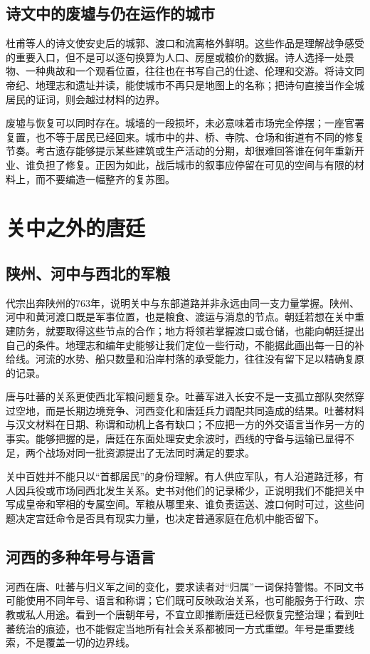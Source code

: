 \subsection{诗文中的废墟与仍在运作的城市}
杜甫等人的诗文使安史后的城郭、渡口和流离格外鲜明。这些作品是理解战争感受的重要入口，但不是可以逐句换算为人口、房屋或粮价的数据。诗人选择一处景物、一种典故和一个观看位置，往往也在书写自己的仕途、伦理和交游。将诗文同帝纪、地理志和遗址并读，能使城市不再只是地图上的名称；把诗句直接当作全城居民的证词，则会越过材料的边界。

废墟与恢复可以同时存在。城墙的一段损坏，未必意味着市场完全停摆；一座官署复置，也不等于居民已经回来。城市中的井、桥、寺院、仓场和街道有不同的修复节奏。考古遗存能够提示某些建筑或生产活动的分期，却很难回答谁在何年重新开业、谁负担了修复。正因为如此，战后城市的叙事应停留在可见的空间与有限的材料上，而不要编造一幅整齐的复苏图。

\section{关中之外的唐廷}

\subsection{陕州、河中与西北的军粮}
代宗出奔陕州的763年，说明关中与东部道路并非永远由同一支力量掌握。陕州、河中和黄河渡口既是军事位置，也是粮食、渡运与消息的节点。朝廷若想在关中重建防务，就要取得这些节点的合作；地方将领若掌握渡口或仓储，也能向朝廷提出自己的条件。地理志和编年史能够让我们定位一些行动，不能据此画出每一日的补给线。河流的水势、船只数量和沿岸村落的承受能力，往往没有留下足以精确复原的记录。

唐与吐蕃的关系更使西北军粮问题复杂。吐蕃军进入长安不是一支孤立部队突然穿过空地，而是长期边境竞争、河西变化和唐廷兵力调配共同造成的结果。吐蕃材料与汉文材料在日期、称谓和动机上各有缺口；不应把一方的外交语言当作另一方的事实。能够把握的是，唐廷在东面处理安史余波时，西线的守备与运输已显得不足，两个战场对同一批资源提出了无法同时满足的要求。

关中百姓并不能只以“首都居民”的身份理解。有人供应军队，有人沿道路迁移，有人因兵役或市场同西北发生关系。史书对他们的记录稀少，正说明我们不能把关中写成皇帝和宰相的专属空间。军粮从哪里来、谁负责运送、渡口何时可过，这些问题决定宫廷命令是否具有现实力量，也决定普通家庭在危机中能否留下。

\subsection{河西的多种年号与语言}
河西在唐、吐蕃与归义军之间的变化，要求读者对“归属”一词保持警惕。不同文书可能使用不同年号、语言和称谓；它们既可反映政治关系，也可能服务于行政、宗教或私人用途。看到一个唐朝年号，不宜立即推断唐廷已经恢复完整治理；看到吐蕃统治的痕迹，也不能假定当地所有社会关系都被同一方式重塑。年号是重要线索，不是覆盖一切的边界线。

